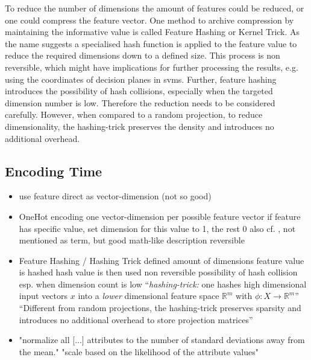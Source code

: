 To reduce the number of dimensions the amount of features could be reduced, or one could compress the feature vector. One method to archive compression by maintaining the informative value is called Feature Hashing or Kernel Trick. \parencite{Weinberger2009,Shi2009}
As the name suggests a specialised hash function is applied to the feature value to reduce the required dimensions down to a defined size.
This process is non reversible, which might have implications for further processing the results, e.g. using the coordinates of decision planes in \glspl{svm}.
Further, feature hashing introduces the possibility of hash collisions, especially when the targeted dimension number is low. Therefore the reduction needs to be considered carefully.
However, when compared to a random projection, to reduce dimensionality, the hashing-trick preserves the density and introduces no additional overhead. \parencite{Weinberger2009,Shi2009}



\subsection{Encoding Time}
\label{sec:background:network:features:time}

\begin{itemize}
	\item use feature direct as vector-dimension (not so good)
	\item OneHot encoding
		\subitem one vector-dimension per possible feature vector
		\subitem if feature has specific value, set dimension for this value to 1, the rest 0
		\subitem also cf. \textcite[][p. 12]{Eskin2002}, not mentioned as term, but good math-like description
		\subitem reversible
	\item Feature Hashing / Hashing Trick
		\subitem defined amount of dimensions
		\subitem feature value is hashed
		\subitem hash value is then used
		\subitem non reversible
		\subitem possibility of hash collision
		\subitem esp. when dimension count is low
		\subitem \enquote{\emph{hashing-trick:} one hashes high dimensional input vectors $x$ into a \emph{lower} dimensional feature space $\mathbb{R}^m$ with $\phi: X \rightarrow \mathbb{R}^m$} \parencite{Weinberger2009,Shi2009,Langford2007}
		\subitem \enquote{Different from random projections, the hashing-trick preserves sparsity and introduces no additional overhead to store projection matrices} \parencite{Weinberger2009}
	\item "normalize all [...] attributes to the number of standard deviations away from the mean." \parencite{Eskin2002}
		\subitem "scale based on the likelihood of the attribute values" \parencite{Eskin2002}
		
\end{itemize}